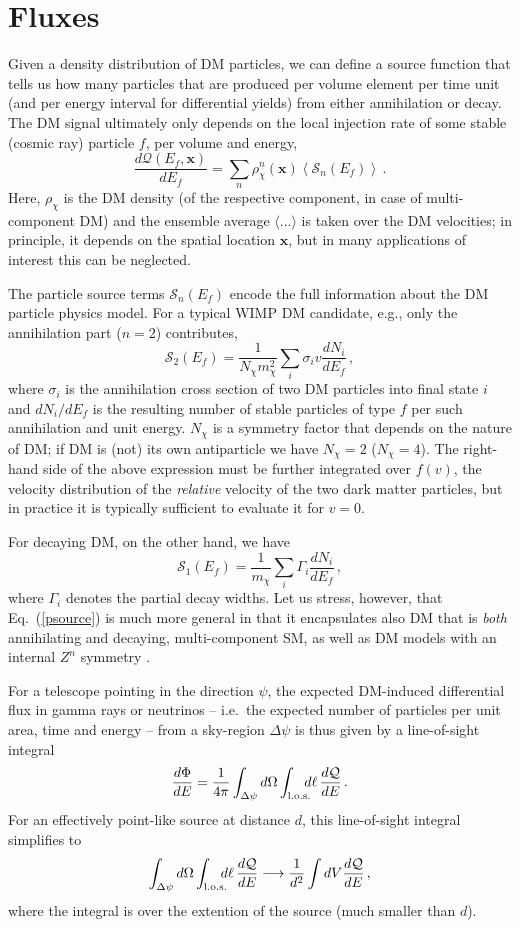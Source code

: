 \documentclass[a4paper,10pt,oneside]{book}
\newcommand{\be}{\begin{equation}}
\newcommand{\ee}{\end{equation}}
\begin{document}
\section{Fluxes}

Given a density distribution of DM particles, we can define a source function that tells 
us how many particles that are produced per volume element per time unit (and per energy interval for differential yields) from either annihilation or decay. 
The DM signal ultimately only depends on the local 
injection rate of some stable (cosmic ray) particle $f$, per volume and energy,
\be
\label{psource}
\frac{d\mathcal{Q}(E_f,\mathbf{x})}{dE_f}=\sum_n \rho_\chi^n(\mathbf{x}) 
\left\langle\mathcal{S}_n(E_f)\right\rangle\,.
\ee
Here, $\rho_\chi$ is the DM density (of the respective component, in case of multi-component DM) 
and the ensemble average $\langle ...\rangle$ is taken 
over the DM velocities; in principle, it  depends on the spatial location $\mathbf{x}$, but in many 
applications of interest this can be neglected. 

The particle source terms $\mathcal{S}_n(E_f)$ encode the full information about 
the DM particle physics model. For a typical WIMP DM candidate, e.g., only the annihilation part ($n=2$)
contributes,
\be
 \mathcal{S}_2(E_f)=\frac{1}{N_\chi m_\chi^2}\sum_i \sigma_i v \frac{dN_i}{dE_f} \,,
 \label{eq:Sann}
\ee
where $\sigma_i$ is the annihilation cross section of two DM particles into final state $i$ and 
$dN_i/dE_f$ is the resulting number of stable particles of type $f$ per such 
annihilation and unit energy. $N_\chi$ is a symmetry factor that depends on the nature of DM; if 
DM is (not) its own antiparticle we have $N_\chi=2$ ($N_\chi=4$). 
The right-hand side of the above expression must be further integrated over $f(v)$, the velocity distribution of 
the \emph{relative} velocity of the two dark matter particles, but in practice it is typically sufficient to evaluate it 
for $v=0$.

For decaying DM, on the other hand, we have
\be
 \mathcal{S}_1(E_f)=\frac{1}{m_\chi}\sum_i \Gamma_i \frac{dN_i}{dE_f} \,,
 \label{eq:Sdec}
\ee
where $\Gamma_i$ denotes the partial decay widths. Let us stress, however, that 
Eq.~(\ref{psource}) is much more general in that it encapsulates also DM that is {\it both} 
annihilating and decaying, multi-component SM, as well as DM models with an internal $Z^n$ 
symmetry \cite{Belanger:2012zr,Belanger:2014bga,Ko:2014nha,Choi:2015bya}. 


For a telescope pointing in the direction $\psi$, the expected DM-induced differential flux in gamma 
rays or neutrinos -- i.e.~the expected number of particles per unit area, time and energy -- from a 
sky-region $\Delta \psi$  is thus given by a line-of-sight integral
\be
 \frac{d\Phi}{dE}= \frac1{4\pi}\int_{\Delta\psi} d\Omega \int_{\rm l.o.s.}\!\!\!\!d\ell\, \frac{d\mathcal{Q}}{dE}\,.
\ee
For an effectively point-like source at distance $d$, this line-of-sight integral simplifies to
\be
\int_{\Delta\psi} d\Omega \int_{\rm l.o.s.}\!\!\!\!d\ell\, \frac{d\mathcal{Q}}{dE}
\longrightarrow \frac{1}{d^2} \int dV \frac{d\mathcal{Q}}{dE}\,,
\ee
where the integral is over the extention of the source (much smaller
than $d$).
\end{document}
